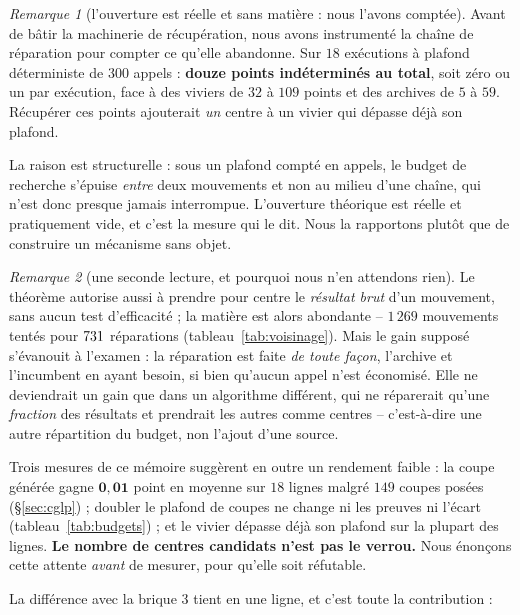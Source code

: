\documentclass[11pt,a4paper]{article}
\theoremstyle{plain}
\theoremstyle{remark}
\newtheorem{remark}{Remarque}
\begin{document}
\begin{remark}[l'ouverture est réelle et sans matière : nous l'avons
comptée]\label{rem:indetermines}
Avant de bâtir la machinerie de récupération, nous avons instrumenté la
chaîne de réparation pour compter ce qu'elle abandonne. Sur $18$ exécutions
à plafond déterministe de $300$ appels : \textbf{douze points indéterminés
au total}, soit zéro ou un par exécution, face à des viviers de $32$ à
$109$ points et des archives de $5$ à $59$. Récupérer ces points ajouterait
\emph{un} centre à un vivier qui dépasse déjà son plafond.

La raison est structurelle : sous un plafond compté en appels, le budget de
recherche s'épuise \emph{entre} deux mouvements et non au milieu d'une
chaîne, qui n'est donc presque jamais interrompue. L'ouverture théorique est
réelle et pratiquement vide, et c'est la mesure qui le dit. Nous la
rapportons plutôt que de construire un mécanisme sans objet.
\end{remark}

\begin{remark}[une seconde lecture, et pourquoi nous n'en attendons rien]
Le théorème autorise aussi à prendre pour centre le \emph{résultat brut}
d'un mouvement, sans aucun test d'efficacité ; la matière est alors
abondante -- $1\,269$ mouvements tentés pour $731{}$ réparations
(tableau~\ref{tab:voisinage}). Mais le gain supposé s'évanouit à l'examen :
la réparation est faite \emph{de toute façon}, l'archive et l'incumbent en
ayant besoin, si bien qu'aucun appel n'est économisé. Elle ne deviendrait un
gain que dans un algorithme différent, qui ne réparerait qu'une
\emph{fraction} des résultats et prendrait les autres comme centres --
c'est-à-dire une autre répartition du budget, non l'ajout d'une source.

Trois mesures de ce mémoire suggèrent en outre un rendement faible : la
coupe générée gagne $\mathbf{0{,}01}$ point en moyenne sur $18$ lignes
malgré $149$ coupes posées (§\ref{sec:cglp}) ; doubler le plafond de coupes ne change ni
les preuves ni l'écart (tableau~\ref{tab:budgets}) ; et le vivier dépasse
déjà son plafond sur la plupart des lignes. \textbf{Le nombre de centres
candidats n'est pas le verrou.} Nous énonçons cette attente \emph{avant} de
mesurer, pour qu'elle soit réfutable.
\end{remark}

\noindent
La différence avec la brique 3 tient en une ligne, et c'est toute la
contribution :
\end{document}
